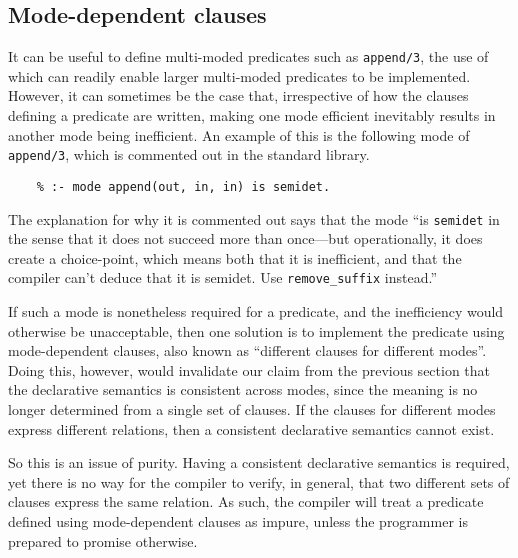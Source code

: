 \subsection{Mode-dependent clauses}
\label{sec:mode-dependent}

It can be useful to define
multi-moded predicates such as \texttt{append/3},
the use of which can readily enable
larger multi-moded predicates to be implemented.
However,
it can sometimes be the case that,
irrespective of how the clauses defining a predicate are written,
making one mode efficient inevitably results in
another mode being inefficient.
An example of this is the following mode of \texttt{append/3},
which is commented out in the standard library.
\begin{verbatim}
    % :- mode append(out, in, in) is semidet.
\end{verbatim}
The explanation for why it is commented out says that the mode
``is \texttt{semidet} in the sense that it does not
succeed more than once---but operationally, it does create a choice-point,
which means both that it is inefficient,
and that the compiler can't deduce that it is semidet.
Use \texttt{remove\_suffix} instead.''

If such a mode is nonetheless required for a predicate,
and the inefficiency would otherwise be unacceptable,
then one solution is to implement the predicate
using mode-dependent clauses,
also known as ``different clauses for different modes''.
Doing this, however,
would invalidate our claim from the previous section
that the declarative semantics is consistent across modes,
since the meaning is no longer determined from a single set of clauses.
If the clauses for different modes express different relations,
then a consistent declarative semantics cannot exist.

So this is an issue of purity.
Having a consistent declarative semantics is required,
yet there is no way for the compiler to verify, in general,
that two different sets of clauses express the same relation.
As such,
the compiler will treat a predicate
defined using mode-dependent clauses as impure,
unless the programmer is prepared to promise otherwise.

